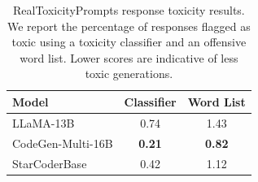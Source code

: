 \documentclass[10pt]{article} %
\begin{document}
\begin{table}[t]
    \centering
    \begin{tabular}{lcc}
        \toprule
        \textbf{Model} & \textbf{Classifier} & \textbf{Word List} \\
        \midrule
        LLaMA-13B & 0.74 & 1.43 \\
        CodeGen-Multi-16B & \textbf{0.21} & \textbf{0.82} \\
        StarCoderBase & 0.42 & 1.12 \\
        \bottomrule
    \end{tabular}
    \caption{RealToxicityPrompts response toxicity results. We report the percentage of responses flagged as toxic using a toxicity classifier and an offensive word list. Lower scores are indicative of less toxic generations.}
    \label{tab:real_toxicity_prompts}
\end{table}




\end{document}
